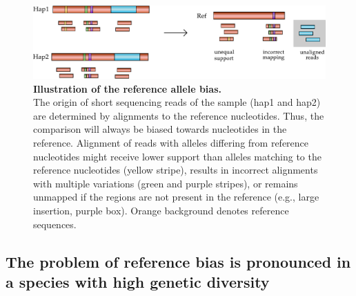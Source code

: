 \documentclass[../main.tex]{subfiles}
\begin{document}
\bigskip

\begin{figure}[!htb]
    \centering
    \includegraphics[width=\textwidth]{intro/fig2.pdf}
        \vspace{3mm}
        \caption[Illustration of the reference allele bias]{\textbf{Illustration of the reference allele bias.} \\
        \footnotesize{The origin of short sequencing reads of the sample (hap1 and hap2) are determined by alignments to the reference nucleotides. Thus, the comparison will always be biased towards nucleotides in the reference. Alignment of reads with alleles differing from reference nucleotides might receive lower support than alleles matching to the reference nucleotides (yellow stripe), results in incorrect alignments with multiple variations (green and purple stripes), or remains unmapped if the regions are not present in the reference (e.g., large insertion, purple box). Orange background denotes reference sequences.}}
        \label{fig12:bias}
\end{figure}

\subsection*{The problem of reference bias is pronounced in a species with high genetic diversity}
\end{document}
